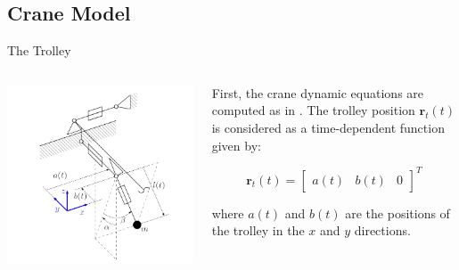 \subsection{Crane Model}
\begin{frame}{The Trolley}
\begin{columns}[T]
    \begin{column}{0.5\textwidth}
        \centering
        \includegraphics[width=\linewidth]{imgs/Crane/3DimCranSchem.PNG}
        \label{fig:Schematics of three dimensional overhead crane}
    \end{column}
    \begin{column}{0.5\textwidth}
        First, the crane dynamic equations are computed as in \cite{Knierim2010Crane}. The trolley position \(\boldsymbol{r}_{t}(t)\) is considered as a time-dependent function given by:

         \vspace{1em} %
         
        \begin{equation}
            \textbf{r}_t(t) = \begin{bmatrix}
                a(t) & b(t) & 0
            \end{bmatrix}^T
        \end{equation}

         \vspace{1em} %
         
        where \(a(t)\) and \(b(t)\) are the positions of the trolley in the \(x\) and \(y\) directions.
    \end{column}
\end{columns}
\end{frame}


